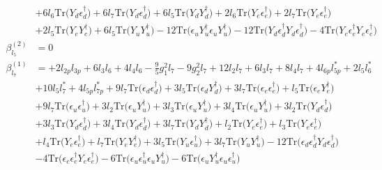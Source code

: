 {\begin{align}
 &+6 l_6 \mbox{Tr}\Big({Y_d  \epsilon_{d}^{\dagger}}\Big) +6 l_7 \mbox{Tr}\Big({Y_d  \epsilon_{d}^{\dagger}}\Big) +6 l_5 \mbox{Tr}\Big({Y_d  Y_{d}^{\dagger}}\Big) +2 l_6 \mbox{Tr}\Big({Y_e  \epsilon_{e}^{\dagger}}\Big) +2 l_7 \mbox{Tr}\Big({Y_e  \epsilon_{e}^{\dagger}}\Big) \nonumber \\ 
 &+2 l_5 \mbox{Tr}\Big({Y_e  Y_{e}^{\dagger}}\Big) +6 l_5 \mbox{Tr}\Big({Y_u  Y_{u}^{\dagger}}\Big) -12 \mbox{Tr}\Big({\epsilon_u  Y_{u}^{\dagger}  \epsilon_u  Y_{u}^{\dagger}}\Big) -12 \mbox{Tr}\Big({Y_d  \epsilon_{d}^{\dagger}  Y_d  \epsilon_{d}^{\dagger}}\Big) -4 \mbox{Tr}\Big({Y_e  \epsilon_{e}^{\dagger}  Y_e  \epsilon_{e}^{\dagger}}\Big) \\ 
\beta_{l_5}^{(2)} & =  
0\\ 
\beta_{l_7}^{(1)} & =  
+2 l_{2p} l_{3p} +6 l_3 l_6 +4 l_4 l_6 -\frac{9}{5} g_{1}^{2} l_7 -9 g_{2}^{2} l_7 +12 l_2 l_7 +6 l_3 l_7 +8 l_4 l_7 +4 l_{6p} l_{5p}^* +2 l_5 l_6^* \nonumber \\ 
 &+10 l_5 l_7^* +4 l_{5p} l_{7p}^* +9 l_7 \mbox{Tr}\Big({\epsilon_d  \epsilon_{d}^{\dagger}}\Big) +3 l_5 \mbox{Tr}\Big({\epsilon_d  Y_{d}^{\dagger}}\Big) +3 l_7 \mbox{Tr}\Big({\epsilon_e  \epsilon_{e}^{\dagger}}\Big) +l_5 \mbox{Tr}\Big({\epsilon_e  Y_{e}^{\dagger}}\Big) \nonumber \\ 
 &+9 l_7 \mbox{Tr}\Big({\epsilon_u  \epsilon_{u}^{\dagger}}\Big) +3 l_2 \mbox{Tr}\Big({\epsilon_u  Y_{u}^{\dagger}}\Big) +3 l_3 \mbox{Tr}\Big({\epsilon_u  Y_{u}^{\dagger}}\Big) +3 l_4 \mbox{Tr}\Big({\epsilon_u  Y_{u}^{\dagger}}\Big) +3 l_2 \mbox{Tr}\Big({Y_d  \epsilon_{d}^{\dagger}}\Big) \nonumber \\ 
 &+3 l_3 \mbox{Tr}\Big({Y_d  \epsilon_{d}^{\dagger}}\Big) +3 l_4 \mbox{Tr}\Big({Y_d  \epsilon_{d}^{\dagger}}\Big) +3 l_7 \mbox{Tr}\Big({Y_d  Y_{d}^{\dagger}}\Big) +l_2 \mbox{Tr}\Big({Y_e  \epsilon_{e}^{\dagger}}\Big) +l_3 \mbox{Tr}\Big({Y_e  \epsilon_{e}^{\dagger}}\Big) \nonumber \\ 
 &+l_4 \mbox{Tr}\Big({Y_e  \epsilon_{e}^{\dagger}}\Big) +l_7 \mbox{Tr}\Big({Y_e  Y_{e}^{\dagger}}\Big) +3 l_5 \mbox{Tr}\Big({Y_u  \epsilon_{u}^{\dagger}}\Big) +3 l_7 \mbox{Tr}\Big({Y_u  Y_{u}^{\dagger}}\Big) -12 \mbox{Tr}\Big({\epsilon_d  \epsilon_{d}^{\dagger}  Y_d  \epsilon_{d}^{\dagger}}\Big) \nonumber \\ 
 &-4 \mbox{Tr}\Big({\epsilon_e  \epsilon_{e}^{\dagger}  Y_e  \epsilon_{e}^{\dagger}}\Big) -6 \mbox{Tr}\Big({\epsilon_u  \epsilon_{u}^{\dagger}  \epsilon_u  Y_{u}^{\dagger}}\Big) -6 \mbox{Tr}\Big({\epsilon_u  Y_{u}^{\dagger}  \epsilon_u  \epsilon_{u}^{\dagger}}\Big) \\ 

\end{align}}
